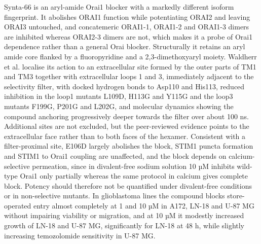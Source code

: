 Synta-66 is an aryl-amide Orai1 blocker with a markedly different isoform fingerprint. It abolishes ORAI1 function while potentiating ORAI2 and leaving ORAI3 untouched, and concatemeric ORAI1-1, ORAI1-2 and ORAI1-3 dimers are inhibited whereas ORAI2-3 dimers are not, which makes it a probe of Orai1 dependence rather than a general Orai blocker. Structurally it retains an aryl amide core flanked by a fluoropyridine and a 2,3-dimethoxyaryl moiety. Waldherr et al. localise its action to an extracellular site formed by the outer parts of TM1 and TM3 together with extracellular loops 1 and 3, immediately adjacent to the selectivity filter, with docked hydrogen bonds to Asp110 and His113, reduced inhibition in the loop1 mutants L109D, H113G and Y115G and the loop3 mutants F199G, P201G and L202G, and molecular dynamics showing the compound anchoring progressively deeper towards the filter over about 100 ns. Additional sites are not excluded, but the peer-reviewed evidence points to the extracellular face rather than to both faces of the hexamer. Consistent with a filter-proximal site, E106D largely abolishes the block, STIM1 puncta formation and STIM1 to Orai1 coupling are unaffected, and the block depends on calcium-selective permeation, since in divalent-free sodium solution 10 µM inhibits wild-type Orai1 only partially whereas the same protocol in calcium gives complete block. Potency should therefore not be quantified under divalent-free conditions or in non-selective mutants. In glioblastoma lines the compound blocks store-operated entry almost completely at 1 and 10 µM in A172, LN-18 and U-87 MG without impairing viability or migration, and at 10 µM it modestly increased growth of LN-18 and U-87 MG, significantly for LN-18 at 48 h, while slightly increasing temozolomide sensitivity in U-87 MG.

